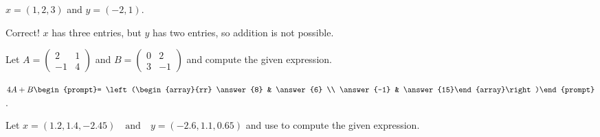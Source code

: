 \documentclass{ximera}
\begin{document}
\begin{exercise}\label{c1.1.3c}
  $x=(1,2,3)$ and $y=(-2,1)$.
  
  \begin{multipleChoice}
  \end{multipleChoice}  

\begin{feedback}[correct]
Correct! $x$ has three entries, but $y$ has two entries, so addition is not possible.
\end{feedback}
\end{exercise}





\problemlabel

\noindent Let $A=\left(\begin{array}{rr} 2 & 1 \\ -1 & 4\end{array}\right)$ and $B=\left(\begin{array}{rr} 0 & 2 \\ 3 & -1\end{array}\right)$ and compute the given  expression.

\begin{exercise}\label{c1.1.4A}
  $4A+B\begin{prompt}= \left(\begin{array}{rr} \answer{8} & \answer{6} \\ \answer{-1} & \answer{15}\end{array}\right)\end{prompt}$.

%
%
\end{exercise}





\matlabproblemlabel

\noindent Let  $x=(1.2,1.4,-2.45) \quad\mbox{and}\quad y=(-2.6,1.1,0.65)$ and use \Matlab to compute the  given expression.
\end{document}
